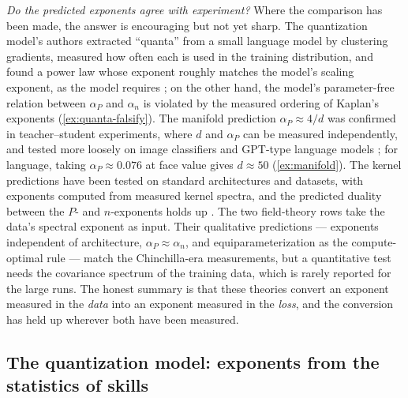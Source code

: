 \documentclass[11pt]{article}
\begin{document}
\emph{Do the predicted exponents agree with experiment?} Where the comparison has been made, the answer is encouraging but not yet sharp. The quantization model's authors extracted ``quanta'' from a small language model by clustering gradients, measured how often each is used in the training distribution, and found a power law whose exponent roughly matches the model's scaling exponent, as the model requires \cite{michaud2023quantization}; on the other hand, the model's parameter-free relation between $\alpha_P$ and $\alpha_n$ is violated by the measured ordering of Kaplan's exponents (\cref{ex:quanta-falsify}). The manifold prediction $\alpha_P\approx 4/d$ was confirmed in teacher--student experiments, where $d$ and $\alpha_P$ can be measured independently, and tested more loosely on image classifiers and GPT-type language models \cite{sharma2020neural}; for language, taking $\alpha_P\approx0.076$ at face value gives $d\approx 50$ (\cref{ex:manifold}). The kernel predictions have been tested on standard architectures and datasets, with exponents computed from measured kernel spectra, and the predicted duality between the $P$- and $n$-exponents holds up \cite{bahri2021explaining}. The two field-theory rows take the data's spectral exponent as input. Their qualitative predictions --- exponents independent of architecture, $\alpha_P\approx\alpha_n$, and equiparameterization as the compute-optimal rule --- match the Chinchilla-era measurements, but a quantitative test needs the covariance spectrum of the training data, which is rarely reported for the large runs.
The honest summary is that these theories convert an exponent measured in the \emph{data} into an exponent measured in the \emph{loss}, and the conversion has held up wherever both have been measured.

\subsection{The quantization model: exponents from the statistics of skills}
\label{sec:quanta}
\end{document}
